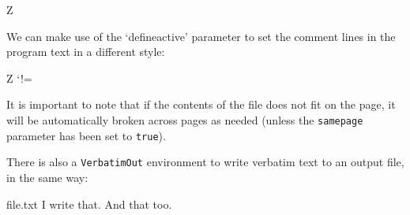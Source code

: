 \documentclass[twoside]{article}
\begin{document}
\begin{SideBySideExample}
  Z



\end{SideBySideExample}

  We can make use of the `defineactive' parameter to set the comment lines
  in the program text in a different style:

\begin{SideBySideExample}
  Z
  \def\ExclamationPoint{\char33}
  \catcode`!=\active
  \VerbatimInput%
    [defineactive=%
      \def!{\color{cyan}\itshape
        \ExclamationPoint}]
    {hello.f90}
\end{SideBySideExample}

  It is important to note that if the contents of the file does not fit on
the page, it will be automatically broken across pages as needed (unless the
\texttt{samepage} parameter has been set to \texttt{true}).

  There is also a \verb+VerbatimOut+ environment to write verbatim text to an
output file, in the same way:

\begin{SideBySideExample}
  \begin{VerbatimOut}{file.txt}
    I write that.
    And that too.
  \end{VerbatimOut}

\end{SideBySideExample}
\end{document}
